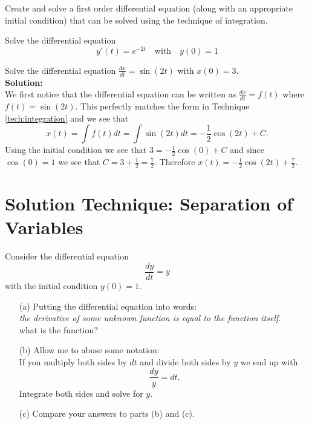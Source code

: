 \begin{problem}
    Create and solve a first order differential equation (along with an appropriate initial
    condition) that can be solved using the technique of integration.
\end{problem}

\begin{problem}
    Solve the differential equation
    \[ y'(t) = e^{-2t} \quad \text{with} \quad y(0) = 1 \]
\end{problem}
\solution{
    \[ y(t) = \int e^{-2t} dt = -\frac{1}{2} e^{-2t} + C \]
    \[ y(0)=1 \implies 1 = -\frac{1}{2} + C \implies C = \frac{3}{2} \implies y(t) =
    -\frac{1}{2} e^{-2t} + \frac{3}{2} \]
}

\begin{example}
    Solve the differential equation $\frac{dx}{dt} = \sin(2t)$ with $x(0) = 3$. \\{\bf
    Solution:} \\
    We first notice that the differential equation can be written as $\frac{dx}{dt} = f(t)$
    where $f(t) = \sin(2t)$.  This perfectly matches the form in Technique
    \ref{tech:integration} and we see that 
    \[ x(t) = \int f(t) dt = \int \sin(2t) dt = -\frac{1}{2} \cos(2t) + C. \]
    Using the initial condition we see that $3 = -\frac{1}{2} \cos(0) + C$ and since
    $\cos(0) = 1$ we see that $C = 3 + \frac{1}{2} = \frac{7}{2}$.  Therefore $x(t) =
    -\frac{1}{2} \cos(2t) + \frac{7}{2}.$
\end{example}

\newpage
\section{Solution Technique: Separation of Variables}
\begin{problem}\label{prob:separation_1}
    Consider the differential equation 
    \[ \frac{dy}{dt} = y \]
    with the initial condition $y(0) = 1$.
    \begin{enumerate}
        \item[(a)] Putting the differential equation into words: \\ {\it the derivative of
            some unknown function is equal to the function itself.} \\
            what is the function?
        \item[(b)] Allow me to abuse some notation: \\
            If you multiply both sides by $dt$ and divide both sides by $y$ we end up with
            \[ \frac{dy}{y} = dt. \]
            Integrate both sides and solve for $y$.
        \item[(c)] Compare your answers to parts (b) and (c).
    \end{enumerate}
\end{problem}

